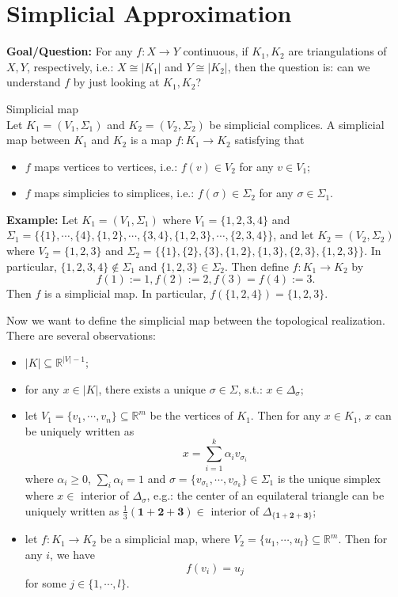\section{Simplicial Approximation}

\noindent\textbf{Goal/Question:} For any $f: X \rightarrow Y$ continuous, if $K_1,K_2$ are triangulations of $X,Y$, respectively, i.e.: $X \cong |K_1|$ and $Y\cong |K_2|$, then the question is: can we understand $f$ by just looking at $K_1,K_2$?

\begin{definition}{Simplicial map}\\
Let $K_1 = (V_1, \Sigma_1)$ and $K_2 = (V_2, \Sigma_2)$ be simplicial complices. A simplicial map between $K_1$ and $K_2$ is a map $f: K_1 \rightarrow K_2$ satisfying that
\begin{itemize}
    \item $f$ maps vertices to vertices, i.e.: $f(v) \in V_2$ for any $v \in V_1$;
    \item $f$ maps simplicies to simplices, i.e.: $f(\sigma) \in \Sigma_2$ for any $\sigma \in \Sigma_1$.
\end{itemize}
\end{definition}

\noindent\textbf{Example:}
Let $K_1 = (V_1, \Sigma_1)$ where $V _ 1= \{ 1,2,3,4\}$ and $\Sigma_1 = \{ \{1\}, \cdots,\{4\}, \{1,2\},\cdots,\{3,4\}, \{1,2,3\}, \cdots, \{2,3,4\}\}$, and let $K_2=(V_2,\Sigma_2)$ where $V_2=\{1,2,3\}$ and $\Sigma_2 = \{ \{1\},\{2\},\{3\}, \{1,2\}, \{1,3\},\{2,3\},\{1,2,3\}\}$. In particular, $\{1,2,3,4\} \notin \Sigma_1$ and $\{1,2,3\} \in \Sigma_2$. Then define $f: K_1 \rightarrow K_2$ by
$$f(1):= 1,f(2):= 2,f(3)=f(4):= 3. $$
Then $f$ is a simplicial map. In particular, $f(\{1,2,4\}) = \{1,2,3\}$.


\vspace{2em}
Now we want to define the simplicial map between the topological realization. There are several observations:
\begin{itemize}
    \item $|K| \subseteq \mathbb{R}^{|V| -1}$;
    \item for any $x \in |K|$, there exists a unique $\sigma \in \Sigma$, s.t.: $x \in \Delta_{\sigma}$;
    \item let $V_1 = \{v_1,\cdots,v_n\} \subseteq \mathbb{R}^m$ be the vertices of $K_1$. Then for any $x \in K_1$, $x$ can be uniquely written as
    $$x = \sum_{i=1}^k \alpha_i v_{\sigma_i}$$
    where $\alpha_i \geq 0$, $\sum_{i} \alpha_i =1$ and $\sigma = \{ v_{\sigma_1}, \cdots ,v_{\sigma_k} \} \in \Sigma_1$ is the unique simplex where $x \in$ interior of $\Delta_\sigma$, e.g.: the center of an equilateral triangle can be uniquely written as $\frac{1}{3} (\mathbf{1} + \mathbf{2} + \mathbf{3}) \in$ interior of $\Delta_{\{ \mathbf{1} + \mathbf{2} + \mathbf{3}\}}$;
    \item let $f: K_1 \rightarrow K_2$ be a simplicial map, where $V_2 = \{ u_1,\cdots,u_l \} \subseteq \mathbb{R}^m$. Then for any $i$, we have
    $$f(v_i) = u_j$$
    for some $j \in \{ 1,\cdots,l \}$.
\end{itemize}

